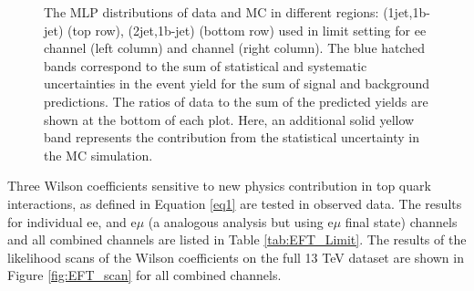 \begin{figure}[ht]
\begin{center}
\begin{tabular}{ccc}
    \end{tabular}
    \caption{The MLP distributions of data and MC in different regions: (1jet,1b-jet) (top row), (2jet,1b-jet) (bottom row) used in limit setting for ee channel (left column) and \mumu channel (right column). The blue hatched bands correspond to the sum of statistical and systematic uncertainties in the event yield for the sum of signal and background predictions. The ratios of data to the sum of the predicted yields are shown at the bottom of each plot. Here, an additional solid yellow band represents the contribution from the statistical uncertainty in the MC simulation.
    \label{fig:limit_binee}}
  \end{center}
\end{figure}


Three Wilson coefficients sensitive to new physics contribution in top quark interactions, as defined in Equation \ref{eq1} are tested in observed data.
The results for individual ee, \mumu and e$\mu$ (a analogous analysis but using e$\mu$ final state) channels and all combined channels are listed in Table \ref{tab:EFT_Limit}.
The results of the likelihood scans of the Wilson coefficients on the full 13 TeV dataset are shown in Figure \ref{fig:EFT_scan} for all combined channels.



